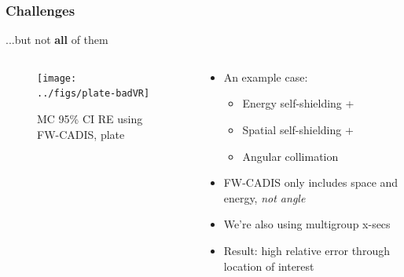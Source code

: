\documentclass[xcolor=x11names,compress, handout]{beamer}
\renewcommand{\(}{\begin{columns}}
\renewcommand{\)}{\end{columns}}
\newcommand{\<}[1]{\begin{column}{#1}}
\renewcommand{\>}{\end{column}}
\begin{document}
\begin{frame}[fragile]
  \frametitle{Challenges}

	...but not \textbf{all} of them
	\begin{columns}
  	\begin{column}{0.45\textwidth}
  	\begin{center}
  	\begin{figure}
  		\texttt{[image: ../figs/plate-badVR]}
  		\caption{MC 95\% CI RE using FW-CADIS, plate \cite{Wilson2015}}
  	\end{figure}
	\end{center}
  	\end{column}
 	\begin{column}{0.5\textwidth}
  	\begin{center}
  	\begin{itemize}
  		\item An example case: 
		\begin{itemize}
		    \item Energy self-shielding + 
		    \item Spatial self-shielding +
		    \item Angular collimation
		\end{itemize}
		\item FW-CADIS only includes space and energy, \textit{not angle} \vspace*{0.5 em}
		\item We're also using multigroup x-secs
		\pause
	    \item Result: high relative error through location of interest \vspace*{0.5 em}
	\end{itemize}
  	\end{center}
  	\end{column}
	\end{columns}

\end{frame}
\end{document}
